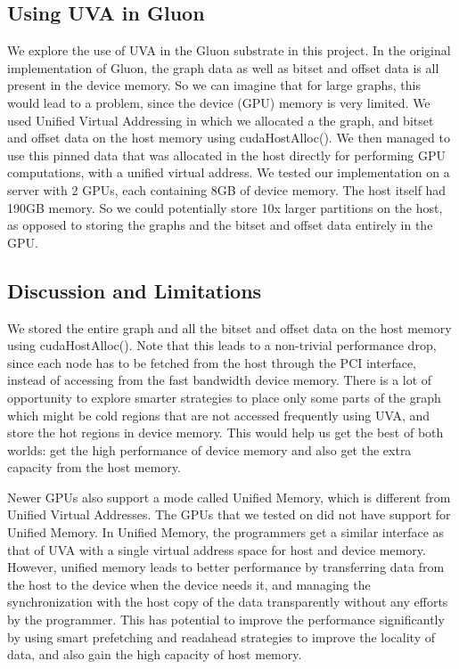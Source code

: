 \subsection{Using UVA in Gluon}
We explore the use of UVA in the Gluon substrate in this project. In the original implementation of Gluon, the graph data as well as bitset and offset data is all present in the device memory. So we can imagine that for large graphs, this would lead to a problem, since the device (GPU) memory is very limited. We used Unified Virtual Addressing in which we allocated a the graph, and bitset and offset data on the host memory using cudaHostAlloc(). We then managed to use this pinned data that was allocated in the host directly for performing GPU computations, with a unified virtual address. We tested our implementation on a server with 2 GPUs, each containing 8GB of device memory. The host itself had 190GB memory. So we could potentially store 10x larger partitions on the host, as opposed to storing the graphs and the bitset and offset data entirely in the GPU. 

\subsection{Discussion and Limitations}
We stored the entire graph and all the bitset and offset data on the host memory using cudaHostAlloc(). Note that this leads to a non-trivial performance drop, since each node has to be fetched from the host through the PCI interface, instead of accessing from the fast bandwidth device memory. There is a lot of opportunity to explore smarter strategies to place only some parts of the graph which might be cold regions that are not accessed frequently using UVA, and store the hot regions in device memory. This would help us get the best of both worlds: get the high performance of device memory and also get the extra capacity from the host memory. 

Newer GPUs also support a mode called Unified Memory, which is different from Unified Virtual Addresses. The GPUs that we tested on did not have support for Unified Memory. In Unified Memory, the programmers get a similar interface as that of UVA with a single virtual address space for host and device memory. However, unified memory leads to better performance by transferring data from the host to the device when the device needs it, and managing the synchronization with the host copy of the data transparently without any efforts by the programmer. This has potential to improve the performance significantly by using smart prefetching and readahead strategies to improve the locality of data, and also gain the high capacity of host memory. 